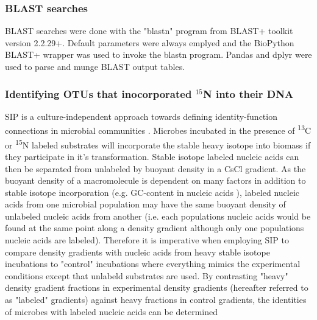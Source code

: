 \subsubsection{BLAST searches}
BLAST searches were done with the "blastn" program from BLAST+ toolkit \citep{20003500} version 2.2.29+. Default parameters were always emplyed and the BioPython \citep{19304878} BLAST+ wrapper was used to invoke the blastn program. Pandas \citep{citeulike:11241428} and dplyr \citep{dplyr} were used to parse and munge BLAST output tables.  

\subsubsection{Identifying OTUs that inocorporated $^{15}$N into their DNA}
SIP is a culture-independent approach towards defining identity-function
connections in microbial communities \citep{Buckley_2011, 17446886}. Microbes
incubated in the presence of \textsuperscript{13}C or \textsuperscript{15}N
labeled substrates will incorporate the stable heavy isotope into biomass if
they participate in it's transformation.  Stable isotope labeled nucleic acids
can then be separated from unlabeled by buoyant density in a CsCl gradient. As
the buoyant density of a macromolecule is dependent on many factors in addition
to stable isotope incorporation (e.g.  GC-content in nucleic acids
\citep{25139123}), labeled nucleic acids from one microbial population may have
the same buoyant density of unlabeled nucleic acids from another (i.e.  each
populations nucleic acids would be found at the same point along a density
gradient although only one populations nucleic acids are labeled). Therefore it
is imperative when employing SIP to compare density gradients with nucleic
acids from heavy stable isotope incubations to "control" incubations where
everything mimics the experimental conditions except that unlabeld substrates
are used. By contrasting "heavy" density gradient fractions in experimental
density gradients (hereafter referred to as "labeled" gradients) against heavy
fractions in control gradients, the identities of microbes with labeled nucleic
acids can be determined 


